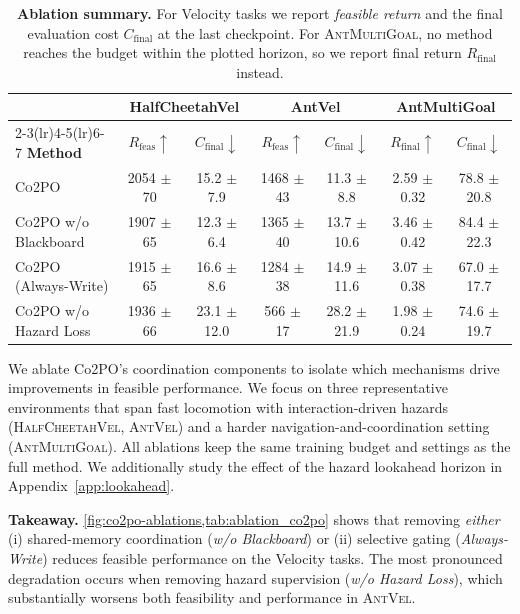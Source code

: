 \documentclass{article}
\theoremstyle{plain}
\theoremstyle{definition}
\theoremstyle{remark}
\begin{document}
\begin{table}[h!]
\centering
\small
\setlength{\tabcolsep}{4pt}
\caption{\textbf{Ablation summary.} For Velocity tasks we report \emph{feasible return} and the final evaluation cost $C_{\mathrm{final}}$ at the last checkpoint.
For \textsc{AntMultiGoal}, no method reaches the budget within the plotted horizon, so we report final return $R_{\mathrm{final}}$ instead.}
\label{tab:ablation_co2po}
\begin{tabular}{lcccccc}
\toprule
& \multicolumn{2}{c}{HalfCheetahVel} & \multicolumn{2}{c}{AntVel} & \multicolumn{2}{c}{AntMultiGoal} \\
\cmidrule(lr){2-3}\cmidrule(lr){4-5}\cmidrule(lr){6-7}
\textbf{Method} &
$R_{\mathrm{feas}}\uparrow$ & $C_{\mathrm{final}}\downarrow$ &
$R_{\mathrm{feas}}\uparrow$ & $C_{\mathrm{final}}\downarrow$ &
$R_{\mathrm{final}}\uparrow$ & $C_{\mathrm{final}}\downarrow$ \\
\midrule
\textsc{Co2PO} & 2054 $\pm$ 70 & 15.2 $\pm$ 7.9 & 1468 $\pm$ 43 & 11.3 $\pm$ 8.8 & 2.59 $\pm$ 0.32 & 78.8 $\pm$ 20.8 \\
\textsc{Co2PO} w/o Blackboard & 1907 $\pm$ 65 & 12.3 $\pm$ 6.4 & 1365 $\pm$ 40 & 13.7 $\pm$ 10.6 & 3.46 $\pm$ 0.42 & 84.4 $\pm$ 22.3 \\
\textsc{Co2PO} (Always-Write) & 1915 $\pm$ 65 & 16.6 $\pm$ 8.6 & 1284 $\pm$ 38 & 14.9 $\pm$ 11.6 & 3.07 $\pm$ 0.38 & 67.0 $\pm$ 17.7 \\
\textsc{Co2PO} w/o Hazard Loss & 1936 $\pm$ 66 & 23.1 $\pm$ 12.0 & 566 $\pm$ 17 & 28.2 $\pm$ 21.9 & 1.98 $\pm$ 0.24 & 74.6 $\pm$ 19.7 \\
\bottomrule
\end{tabular}
\end{table}

We ablate Co2PO's coordination components to isolate which mechanisms drive improvements in feasible performance.
We focus on three representative environments that span fast locomotion with interaction-driven hazards (\textsc{HalfCheetahVel}, \textsc{AntVel}) and a harder navigation-and-coordination setting (\textsc{AntMultiGoal}).
All ablations keep the same training budget and settings as the full method. We additionally study the effect of the hazard lookahead horizon in Appendix~\ref{app:lookahead}.

\textbf{Takeaway.}
\cref{fig:co2po-ablations,tab:ablation_co2po} shows that removing \emph{either} (i) shared-memory coordination (\emph{w/o Blackboard}) or (ii) selective gating (\emph{Always-Write}) reduces feasible performance on the Velocity tasks.
The most pronounced degradation occurs when removing hazard supervision (\emph{w/o Hazard Loss}), which substantially worsens both feasibility and performance in \textsc{AntVel}.
\end{document}
